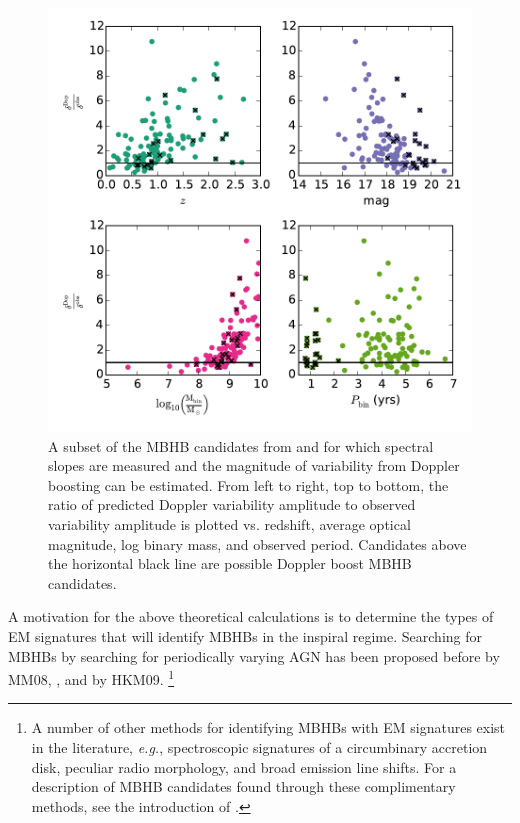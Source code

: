 \begin{figure}
\begin{center}
\includegraphics[scale=0.55]{figures/ch0/PTF_xsiGtr1_vs_z_M_P_alph_I90} 
\end{center}
\caption{A subset of the MBHB candidates from \citep{Graham+2015b} and \citep[][denoted by black x's]{Charisi+2016} for which spectral slopes are measured and the magnitude of variability from Doppler boosting can be estimated. From left to right, top to bottom, the ratio of predicted Doppler variability amplitude to observed variability amplitude is plotted vs. redshift, average optical magnitude, log binary mass, and observed period. Candidates above the horizontal black line are possible Doppler boost MBHB candidates.}
\label{Fig:DopCan}
\end{figure}


A motivation for the above theoretical calculations is to
determine the types of EM signatures that will identify MBHBs in the inspiral
regime. Searching for MBHBs by searching for periodically varying AGN has been
proposed before by MM08, \cite{Haiman+2009}, and by HKM09. \footnote{A number
of other methods for identifying MBHBs with EM signatures exist in the
literature, \textit{e.g.}, spectroscopic signatures of a circumbinary accretion
disk, peculiar radio morphology, and broad emission line shifts. For a description of
MBHB candidates found through these complimentary methods, see the
introduction of \cite{Charisi+2016}.}
 

